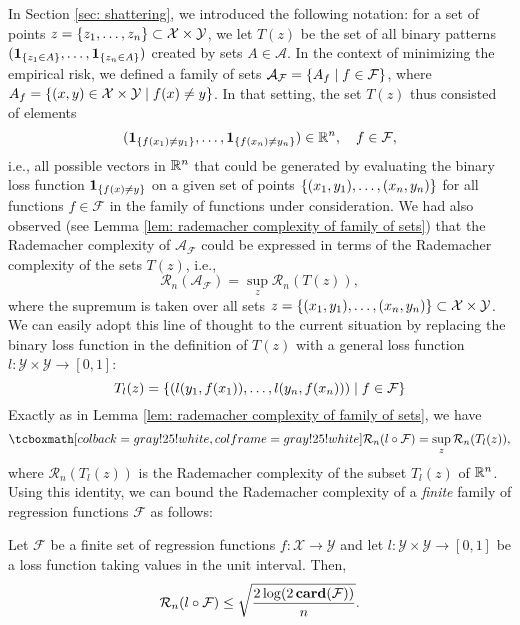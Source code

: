 In Section \ref{sec: shattering}, we introduced the following notation: for a set of points $z = \left\{z_1, \dots, z_n\right\} \subset \mathcal{X} \times \mathcal{Y}$, we let $T(z)$ be the set of all binary patterns $(\mathbf{1}_{\left\{z_1 \in A\right\}}, \dots, \mathbf{1}_{\left\{z_n \in A\right\}})$ created by sets $A \in \mathcal{A}$. In the context of minimizing the empirical risk, we defined a family of sets $\mathcal{A}_{\mathcal{F}} = \left\{A_f \mathrel{|} f \in \mathcal{F}\right\}$, where $A_f = \left\{(x, y) \in \mathcal{X} \times \mathcal{Y} \mathrel{|} f(x) \neq y\right\}$. In that setting, the set $T(z)$ thus consisted of elements
\[
    (\mathbf{1}_{\left\{f(x_1) \neq y_1\right\}}, \dots, \mathbf{1}_{\left\{f(x_n) \neq y_n\right\}}) \in \mathbb{R}^n, \quad f \in \mathcal{F},
\]
i.e., all possible vectors in $\mathbb{R}^n$ that could be generated by evaluating the binary loss function $\mathbf{1}_{\left\{f(x) \neq y\right\}}$ on a given set of points $\left\{(x_1, y_1), \dots, (x_n, y_n)\right\}$ for all functions $f \in \mathcal{F}$ in the family of functions under consideration. We had also observed (see Lemma \ref{lem: rademacher complexity of family of sets}) that the Rademacher complexity of $\mathcal{A}_{\mathcal{F}}$ could be expressed in terms of the Rademacher complexity of the sets $T(z)$, i.e.,
\[
    \mathcal{R}_n(\mathcal{A}_{\mathcal{F}}) = \sup_{z} \mathcal{R}_n(T(z)),
\]
where the supremum is taken over all sets $z = \left\{(x_1, y_1), \dots, (x_n, y_n)\right\} \subset \mathcal{X} \times \mathcal{Y}$. We can easily adopt this line of thought to the current situation by replacing the binary loss function in the definition of $T(z)$ with a general loss function $l \colon \mathcal{Y} \times \mathcal{Y} \to [0, 1]$:
\begin{equation}
    T_l(z) = \left\{( l(y_1, f(x_1)), \dots, l(y_n, f(x_n)) ) \mathrel{|} f \in \mathcal{F}\right\}
\end{equation}
Exactly as in Lemma \ref{lem: rademacher complexity of family of sets}, we have
\begin{equation}
\label{eq: rademacher complexity for general loss}
    \highlightMath{
        \mathcal{R}_n(l \circ \mathcal{F}) = \sup_z \mathcal{R}_n(T_l(z)),
    }
\end{equation}
where $\mathcal{R}_n(T_l(z))$ is the Rademacher complexity of the subset $T_l(z)$ of $\mathbb{R}^n$. Using this identity, we can bound the Rademacher complexity of a \emph{finite} family of regression functions $\mathcal{F}$ as follows:

\begin{proposition}
\label{prop: bound on rademacher complexity for general loss}
Let $\mathcal{F}$ be a finite set of regression functions $f \colon \mathcal{X} \to \mathcal{Y}$ and let $l \colon \mathcal{Y} \times \mathcal{Y} \to [0, 1]$ be a loss function taking values in the unit interval. Then,
\[
    \mathcal{R}_n(l \circ \mathcal{F}) \leq \sqrt{\frac{2 \log(2 \, \mathrm{\mathbf{card}}(\mathcal{F}))}{n}}.
\]
\end{proposition}

